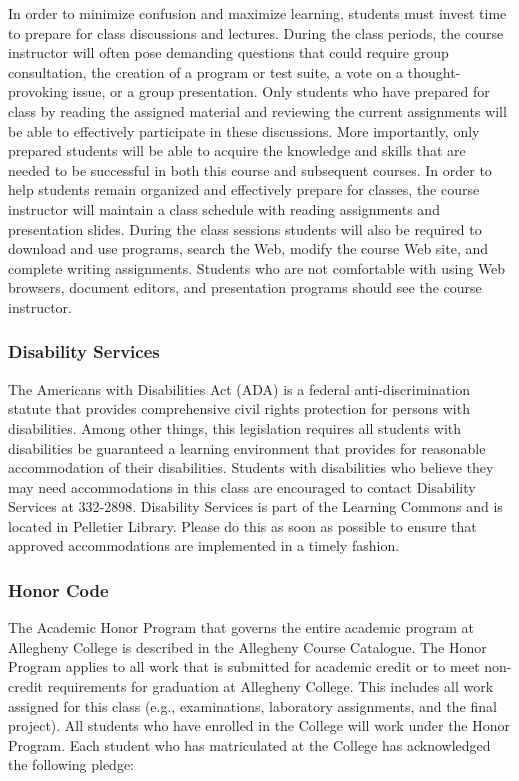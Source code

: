 In order to minimize confusion and maximize learning, students must invest time to prepare for class discussions and
lectures.  During the class periods, the course instructor will often pose demanding questions that could require group
consultation, the creation of a program or test suite, a vote on a thought-provoking issue, or a group presentation.
Only students who have prepared for class by reading the assigned material and reviewing the current assignments will be
able to effectively participate in these discussions.  More importantly, only prepared students will be able to acquire
the knowledge and skills that are needed to be successful in both this course and subsequent courses.  In order to help
students remain organized and effectively prepare for classes, the course instructor will maintain a class schedule with
reading assignments and presentation slides.   During the class sessions students will also be required to download and
use programs, search the Web, modify the course Web site, and complete writing assignments.  Students who are
not comfortable with using Web browsers, document editors, and presentation programs should see the course instructor.

\subsubsection*{Disability Services}

The Americans with Disabilities Act (ADA) is a federal anti-discrimination statute that provides comprehensive civil
rights protection for persons with disabilities.  Among other things, this legislation requires all students with
disabilities be guaranteed a learning environment that provides for reasonable accommodation of their disabilities.
Students with disabilities who believe they may need accommodations in this class are encouraged to contact Disability
Services at 332-2898.  Disability Services is part of the Learning Commons and is located in Pelletier Library.
Please do this as soon as possible to ensure that approved accommodations are implemented in a timely fashion.

\subsubsection*{Honor Code}

The Academic Honor Program that governs the entire academic program at Allegheny College is described in the Allegheny
Course Catalogue.  The Honor Program applies to all work that is submitted for academic credit or to meet non-credit
requirements for graduation at Allegheny College.  This includes all work assigned for this class (e.g., examinations,
laboratory assignments, and the final project).  All students who have enrolled in the College will work under the Honor
Program.  Each student who has matriculated at the College has acknowledged the following pledge:

